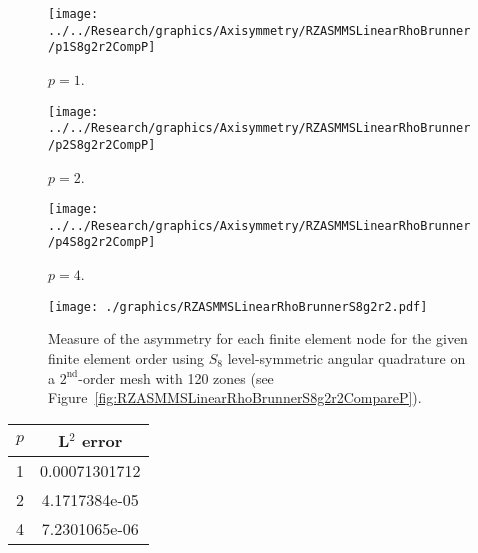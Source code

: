 \documentclass[12pt]{article}
\begin{document}
\begin{sidewaysfigure}[!htb]
\centering
\begin{subfigure}{0.33\textwidth}
\texttt{[image: ../../Research/graphics/Axisymmetry/RZASMMSLinearRhoBrunner/p1S8g2r2CompP]}
\caption{$p=1$.}
\end{subfigure}%
\begin{subfigure}{0.33\textwidth}
\texttt{[image: ../../Research/graphics/Axisymmetry/RZASMMSLinearRhoBrunner/p2S8g2r2CompP]}
\caption{$p=2$.}
\end{subfigure}%
\begin{subfigure}{0.33\textwidth}
\texttt{[image: ../../Research/graphics/Axisymmetry/RZASMMSLinearRhoBrunner/p4S8g2r2CompP]}
\caption{$p=4$.}
\end{subfigure}
\caption{Relative asymmetry for $p=\{1,2,4\}$ finite elements on a $2^\text{nd}$-order mesh for $S_8$ level-symmetric angular quadrature.}
\label{fig:RZASMMSLinearRhoBrunnerS8g2r2CompareP}
\end{sidewaysfigure}

\begin{figure}[!htb]
\centering
\texttt{[image: ./graphics/RZASMMSLinearRhoBrunnerS8g2r2.pdf]}
\caption{Measure of the asymmetry for each finite element node for the given finite element order using $S_8$ level-symmetric angular quadrature on a $2^\text{nd}$-order mesh with 120 zones (see Figure~\ref{fig:RZASMMSLinearRhoBrunnerS8g2r2CompareP}).}
\label{fig:RZASMMSLinearRhoBrunnerS8g2r2Nodes}
\end{figure}

\begin{table}[!htb]
\centering
{\renewcommand{\arraystretch}{1.5}
\begin{tabular}{|c|c|}
\hline
$p$ & L$^2$ error \\\hline
1 & 0.00071301712 \\\hline
2 & 4.1717384e-05 \\\hline
4 & 7.2301065e-06 \\\hline
\end{tabular}}
\end{table}
\end{document}
